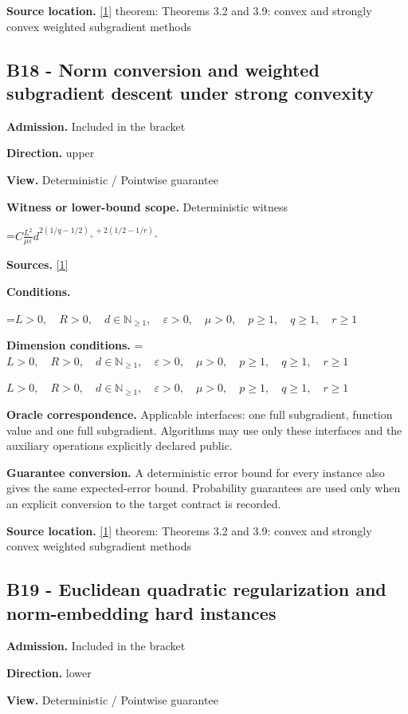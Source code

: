 \documentclass[10pt,a4paper]{article}
\newcommand{\AtlasMath}[1]{\par\begingroup\centering\setbox0=\hbox{$\displaystyle #1$}\ifdim\wd0>1.4\linewidth\typeout{ATLAS WIDE FORMULA: \the\wd0}\fi\ifdim\wd0>\linewidth\resizebox{\linewidth}{!}{\box0}\else\box0\fi\par\endgroup}
\newcommand{\AtlasInlineMath}[1]{\begingroup\setbox0=\hbox{$#1$}\ifdim\wd0>.4\linewidth\endgroup\AtlasMath{#1}\else\endgroup$#1$\fi}
\begin{document}
\textbf{Source location.} \href{https://arxiv.org/pdf/1405.4980}{[1]} theorem: Theorems 3.2 and 3.9: convex and strongly convex weighted subgradient methods

\subsection{B18 - Norm conversion and weighted subgradient descent under strong convexity}
\textbf{Admission.} Included in the bracket

\textbf{Direction.} upper

\textbf{View.} Deterministic / Pointwise guarantee

\textbf{Witness or lower-bound scope.} Deterministic witness

\AtlasMath{C\frac{L^2}{\mu\varepsilon}d^{2(1/q-1/2)_++2(1/2-1/r)_+}}
\textbf{Sources.} \href{https://arxiv.org/pdf/1405.4980}{[1]}

\textbf{Conditions.} 
\AtlasMath{L>0,\quad R>0,\quad d\in\mathbb{N}_{\ge1},\quad \varepsilon>0,\quad \mu>0,\quad p\ge1,\quad q\ge1,\quad r\ge1}


\textbf{Dimension conditions.} \AtlasInlineMath{L>0,\quad R>0,\quad d\in\mathbb{N}_{\ge1},\quad \varepsilon>0,\quad \mu>0,\quad p\ge1,\quad q\ge1,\quad r\ge1}

\textbf{Oracle correspondence.} Applicable interfaces: one full subgradient, function value and one full subgradient. Algorithms may use only these interfaces and the auxiliary operations explicitly declared public.

\textbf{Guarantee conversion.} A deterministic error bound for every instance also gives the same expected-error bound. Probability guarantees are used only when an explicit conversion to the target contract is recorded.

\textbf{Source location.} \href{https://arxiv.org/pdf/1405.4980}{[1]} theorem: Theorems 3.2 and 3.9: convex and strongly convex weighted subgradient methods

\subsection{B19 - Euclidean quadratic regularization and norm-embedding hard instances}
\textbf{Admission.} Included in the bracket

\textbf{Direction.} lower

\textbf{View.} Deterministic / Pointwise guarantee
\end{document}
